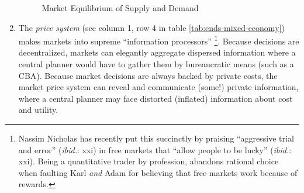 \begin{enumerate}
\begin{figure}[htbp]
		\caption{Market Equilibrium of Supply and Demand}
		\label{fig:supply-demand}
	\end{figure}
	\item The \emph{price system} (see column 1, row 4 in table \ref{tab:ends-mixed-economy}) makes markets into supreme ``information processors'' \citep{Hayek1931}\footnote{
		Nassim Nicholas \cite{Taleb2007} has recently put this succinctly by praising ``aggressive trial and error'' (\emph{ibid.}: xxi) in free markets that ``allow people to be lucky'' (\emph{ibid.}: xxi). Being a quantitative trader by profession, \cite{Taleb2007} abandons rational choice when faulting Karl \cite{Marx-1867-aa} \emph{and} Adam \cite{Smith-1776-lq} for believing that free markets work because of rewards.}. 
	Because decisions are decentralized, markets can elegantly aggregate dispersed information where a central planner would have to gather them by bureaucratic means (such as a \gls{CBA}). Because market decisions are always backed by private costs, the market price system can reveal and communicate (some!) private information, where a central planner may face distorted (inflated) information about cost and utility.
\end{enumerate}

